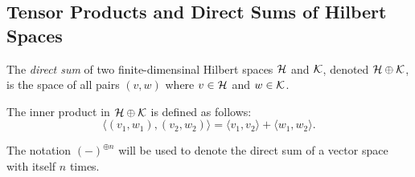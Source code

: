 \subsection {Tensor Products and Direct Sums of Hilbert Spaces}

\begin{definition}
  The \emph{direct sum} of two finite-dimensinal Hilbert spaces $\mathcal{H}$ and $\mathcal{K}$, denoted $\mathcal{H} \oplus \mathcal{K}$, is the space of all pairs $(v, w)$ where $v \in \mathcal{H}$ and $w \in \mathcal{K}$.
\end{definition}

The inner product in $\mathcal{H} \oplus \mathcal{K}$ is defined as follows:
\begin{equation*}
  \langle (v_1, w_1), (v_2, w_2) \rangle = \langle v_1, v_2 \rangle + \langle w_1, w_2 \rangle.
\end{equation*}

The notation $(-)^{\oplus n}$ will be used to denote the direct sum of a vector space with itself $n$ times.





